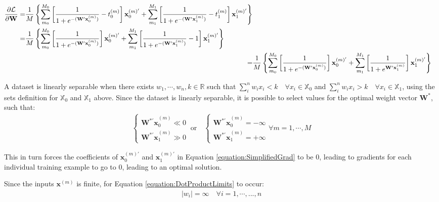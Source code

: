 \documentclass[a4paper,12pt]{article}
\begin{document}
\begin{align}
\begin{split}
\pdv{\mathcal{L}}{\mathbf{W}} =& \frac{1}{M}  \left\{ \sum_{m_0}^{M_0} \left[ \frac{1}{1 + e^{- 
	(\mathbf{W'x}_0^{(m)}) }} - t_0^{(m)} \right] \mathbf{x}_0^{(m)'} +
    \sum_{m_1}^{M_1} \left[ \frac{1}{1 + e^{- (\mathbf{W'x}_1^{(m)}) }} - t_1^{(m)} \right] 
    \mathbf{x}_1^{(m)'} \right\} \\
=& \frac{1}{M}  \left\{ \sum_{m_0}^{M_0} \left[ \frac{1}{1 + e^{- 
	(\mathbf{W'x}_0^{(m)}) }} \right] \mathbf{x}_0^{(m)'} +
    \sum_{m_1}^{M_1} \left[ \frac{1}{1 + e^{- (\mathbf{W'x}_1^{(m)}) }} - 1 \right] 
    \mathbf{x}_1^{(m)'} \right\}
\end{split} \\
\label{equation:SimplifiedGrad}
=& \frac{1}{M}  \left\{ \sum_{m_0}^{M_0} \left[ \frac{1}{1 + e^{- 
	(\mathbf{W'x}_0^{(m)}) }} \right] \mathbf{x}_0^{(m)'} +
    \sum_{m_1}^{M_1} \left[ \frac{1}{1 + e^{\mathbf{W'x}_1^{(m)}}} \right] 
    \mathbf{x}_1^{(m)'} \right\}
\end{align}


A dataset is linearly separable when there exists $w_1, \cdots, w_n, k \in \mathbb{R}$ such that $ \sum_i^n w_i x_i < k \quad \forall x_i \in \mathbb{X}_0 $ and $ \sum_i^n w_i x_i > k \quad \forall x_i \in \mathbb{X}_1 $, using the sets definition for $\mathbb{X}_0$ and $\mathbb{X}_1$ above. Since the dataset is linearly separable, it is possible to select values for the optimal weight vector $\mathbf{W}^{*}$, such that:
\begin{align}
\label{equation:DotProductLimits}
\begin{cases}
\mathbf{W^{*'}x}_0^{(m)} \ll 0\\
\mathbf{W^{*'}x}_1^{(m)} \gg 0
\end{cases} \ \text{or} \quad
\begin{cases}
\mathbf{W^{*'}x}_0^{(m)} = - \infty \\
\mathbf{W^{*'}x}_1^{(m)} = + \infty
\end{cases}
\forall m = 1, \cdots, M
\end{align}

This in turn forces the coefficients of $\mathbf{x}_0^{(m)'}$ and $\mathbf{x}_1^{(m)'}$ in Equation \ref{equation:SimplifiedGrad} to be 0, leading to gradients for each individual training example to go to 0, leading to an optimal solution.

Since the inputs $\mathbf{x}^{(m)}$ is finite, for Equation \ref{equation:DotProductLimits} to occur:
\begin{align}
|w_i| = \infty \quad \forall i = 1, \cdots, ..., n
\end{align}
\end{document}
